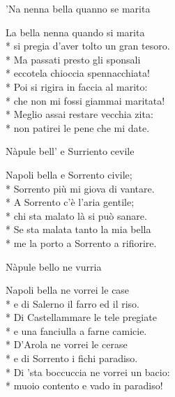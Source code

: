\documentclass[11pt]{book}
\begin{document}
\begin{poem}{’Na nenna bella quanno se marita}{}
\settowidth{\versewidth}{Si pregia d’aver tolto un gran tesoro}
\begin{altverse}
La bella nenna quando si marita\\*
si pregia d’aver tolto un gran tesoro.\\*
Ma passati presto gli sponsali\\*
eccotela chioccia spennacchiata!\\*
Poi si rigira in faccia al marito:\\*
che non mi fossi giammai maritata!\\*
Meglio assai restare vecchia zita:\\*
non patirei le pene che mi date.
\end{altverse}
\end{poem}

\begin{poem}{Nàpule bell’ e Surriento cevile}{}
\settowidth{\versewidth}{Me la porto a Sorrento a rifiorire}
\begin{altverse}
Napoli bella e Sorrento civile;\\*
Sorrento più mi giova di vantare.\\*
A Sorrento c’è l’aria gentile;\\*
chi sta malato là si può sanare.\\*
Se sta malata tanto la mia bella\\*
me la porto a Sorrento a rifiorire.
\end{altverse}
\end{poem}

\begin{poem}{Nàpule bello ne vurria}{}
\settowidth{\versewidth}{Di ’sta boccuccia ne vorrei un bacio}
\begin{altverse}
Napoli bella ne vorrei le case\\*
e di Salerno il farro ed il riso.\\*
Di Castellammare le tele pregiate\\*
e una fanciulla a farne camicie.\\*
D’Arola ne vorrei le cerase\\*
e di Sorrento i fichi paradiso.\\*
Di ’sta boccuccia ne vorrei un bacio:\\*
muoio contento e vado in paradiso!
\end{altverse}
\end{poem}
\end{document}

